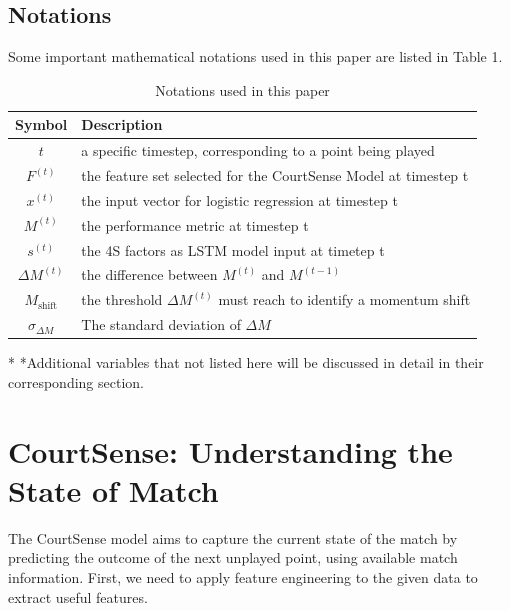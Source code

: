 \documentclass[12pt]{article}  %
\begin{document}
\subsection{Notations}
Some important mathematical notations used in this paper are listed in Table 1. 
\begin{table}[htbp]
\begin{center}
\caption{Notations used in this paper}
\begin{tabular}{c l}
\toprule[2pt]
\multicolumn{1}{m{3cm}}{\centering Symbol} & \multicolumn{1}{m{8cm}}{\centering Description }\\
\midrule
$t$ & a specific timestep, corresponding to a point being played \\
$F^{(t)}$ & the feature set selected for the CourtSense Model at timestep t \\
$x^{(t)}$ & the input vector for logistic regression at timestep t \\
$M^{(t)}$ & the performance metric at timestep t \\
$s^{(t)}$ & the 4S factors as LSTM model input at timetep t \\
\vspace{5pt}%
$\Delta M^{(t)}$ & the difference between $M^{(t)}$ and $M^{(t-1)}$ \\
\vspace{2pt}
$M_\text{shift}$ & the threshold $\Delta M^{(t)}$ must reach to identify a momentum shift\\
$\sigma_{\Delta M}$ & The standard deviation of $\Delta M$\\
\bottomrule[2pt]
\end{tabular}\label{tb:notation}
 \begin{tablenotes}
        \footnotesize
        \item[*] *Additional variables that not listed here will be discussed in detail in their corresponding section. %
      \end{tablenotes}
\end{center}
\end{table}
\vspace{-1cm}%






\section{CourtSense: Understanding the State of Match}
The CourtSense model aims to capture the current state of the match by predicting the outcome of the next unplayed point, using available match information. First, we need to apply feature engineering to the given data to extract useful features.
\end{document}
